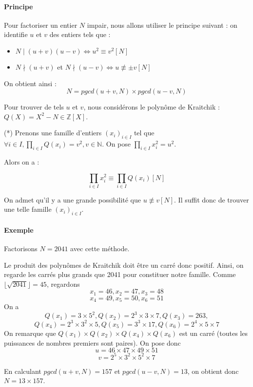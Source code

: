 \documentclass[11pt,a4paper]{article}
\begin{document}
	\paragraph{Principe}
	Pour factoriser un entier $N$ impair, nous allons utiliser le principe suivant : on identifie $u$ et $v$ des entiers tels que :
	\begin{itemize}
		\item $N \mid(u+v)(u-v) \iff u^2 \equiv v^2 [N]$
		\item $N \nmid(u+v)$ et $ N \nmid(u-v) \iff u \not\equiv \pm v [N]$ 
	\end{itemize}
	
	On obtient ainsi :
	$$N = pgcd(u+v, N) \times pgcd(u-v, N)$$
	
	Pour trouver de tels $u$ et $v$, nous considérons le polynôme de Kraitchik : $Q(X) = X^2 - N  \in \mathbb{Z}[X]$.
	
	(*) Prenons une famille d'entiers $(x_i)_{i \in I}$ tel que $\forall i \in I, \prod_{i \in I} Q(x_i) = v^2, v \in \mathbb{N}$. On pose $\prod_{i \in I}x_i^2 = u^2$.
	
	 Alors on a : 
	
		$$\prod_{i \in I} x_i^2 \equiv \prod_{i \in I} Q(x_i) [N]$$
		
	On admet qu'il y a une grande possibilité que $u \not\equiv v [N]$.	
	Il suffit donc de trouver une telle famille $(x_i)_{i \in I}$.
	
	\paragraph{Exemple}
	Factorisons $N = 2041$ avec cette méthode.
	
	Le produit des polynômes de Kraitchik doit être un carré donc positif. Ainsi, on regarde les carrés plus grands que 2041 pour constituer notre famille.
	Comme $\lfloor \sqrt{2041} \rfloor = 45$, regardons 
	$$ x_1 = 46,  x_2 = 47, x_3 = 48$$ $$x_4 = 49, x_5 = 50, x_6 = 51$$
	On a 
	$$ Q(x_1) = 3 \times 5^2, Q(x_2) = 2^3 \times 3 \times 7, Q(x_3) = 263,$$
	$$ Q(x_4) = 2^3 \times 3^2 \times 5, Q(x_5) = 3^3 \times 17, Q(x_6) = 2^4 \times 5 \times 7$$
	On remarque que $Q(x_1) \times Q(x_2) \times Q(x_4) \times Q(x_6)$ est un carré (toutes les puissances de nombres premiers sont paires). On pose donc 
	$$u = 46 \times 47 \times 49 \times 51$$ $$v = 2^5 \times 3^2 \times 5^2 \times 7$$
	
	En calculant $pgcd(u+v, N) = 157$ et $pgcd(u-v, N) = 13$, on obtient donc $N = 13 \times 157$.
	
\end{document}
